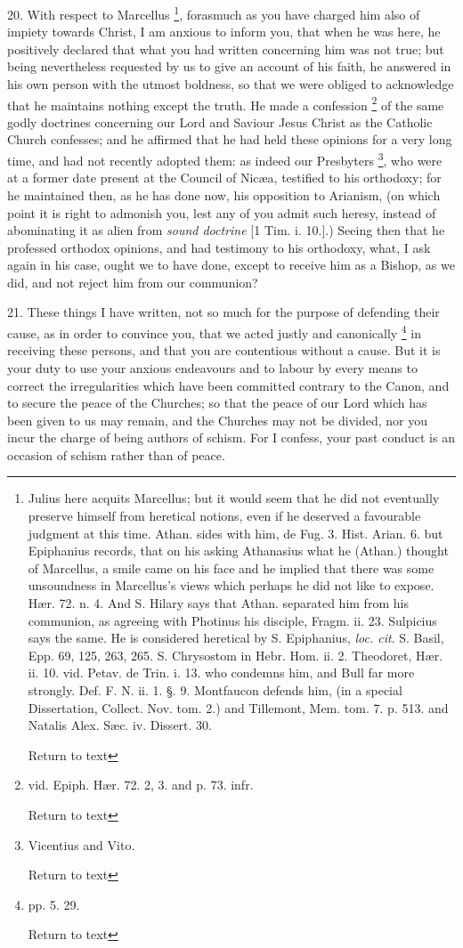20. With respect to Marcellus \footnote{Julius here acquits Marcellus; but it would seem that he did not
eventually preserve himself from heretical notions, even if he
deserved a favourable judgment at this time. Athan. sides with him, de
Fug. 3. Hist. Arian. 6. but Epiphanius records, that on his asking
Athanasius what he (Athan.) thought of Marcellus, a smile came on his
face and he implied that there was some unsoundness in Marcellus's
views which perhaps he did not like to expose. Hær. 72. n. 4. And S.
Hilary says that Athan. separated him from his communion, as agreeing
with Photinus his disciple, Fragm. ii. 23. Sulpicius says the same. He
is considered heretical by S. Epiphanius, \emph{loc. cit}. S. Basil,
Epp. 69, 125, 263, 265. S. Chrysostom in Hebr. Hom. ii. 2. Theodoret,
Hær. ii. 10. vid. Petav. de Trin. i. 13. who condemns him, and Bull
far more strongly. Def. F. N. ii. 1. §. 9. Montfaucon defends him,
(in a special Dissertation, Collect. Nov. tom. 2.) and Tillemont, Mem.
tom. 7. p. 513. and Natalis Alex. Sæc. iv. Dissert. 30.

Return to text}, forasmuch as you have charged him also of impiety towards
Christ, I am anxious to inform you, that when he was here, he
positively declared that what you had written concerning him was not
true; but being nevertheless requested by us to give an account of his
faith, he answered in his own person with the utmost boldness, so that
we were obliged to acknowledge that he maintains nothing except the
truth. He made a confession \footnote{vid. Epiph. Hær. 72. 2, 3. and p. 73. infr.

Return to text} of the same godly doctrines concerning our Lord and Saviour
Jesus Christ as the Catholic Church confesses; and he affirmed that he
had held these opinions for a very long time, and had not recently
adopted them: as indeed our Presbyters \footnote{Vicentius and Vito.

Return to text}, who were at a former date present at the Council of Nicæa,
testified to his orthodoxy; for he maintained then, as he has done
now, his opposition to Arianism, (on which point it is right to
admonish you, lest any of you admit such heresy, instead of
abominating it as alien from \emph{sound doctrine} [1 Tim. i. 10.].)
Seeing then that he professed orthodox opinions, and had
testimony to his orthodoxy, what, I ask again in his case, ought we to
have done, except to receive him as a Bishop, as we did, and not
reject him from our communion?

21. These things I have written, not so much for
the purpose of defending their cause, as in order to convince you,
that we acted justly and canonically \footnote{pp. 5. 29.

Return to text} in receiving these persons, and that you are contentious
without a cause. But it is your duty to use your anxious endeavours
and to labour by every means to correct the irregularities which have
been committed contrary to the Canon, and to secure the peace of the
Churches; so that the peace of our Lord which has been given to us may
remain, and the Churches may not be divided, nor you incur the charge
of being authors of schism. For I confess, your past conduct is an
occasion of schism rather than of peace.

